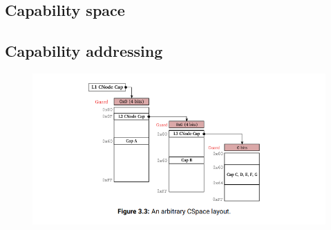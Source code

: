 \subsection{Capability space}


\subsection{Capability addressing}


\begin{figure}
    \includegraphics[scale=0.5]{./figures/seL4_cap_space_addresssing.png}
    \label{asdfasd}
\end{figure}

